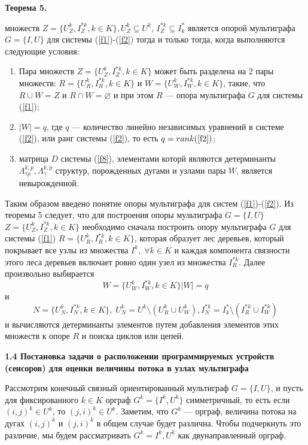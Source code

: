 \documentclass[14pt]{extarticle}%
\begin{document}
\textbf{Теорема 5.} { множеств $Z=\{U^k_Z, I^{*k}_Z, k\in K\}, U^k_Z\subseteq U^k,\, I^{*k}_Z\subseteq I^*_k$ является опорой мультиграфа $G=\{I,U\}$ для системы (\ref{f1})-(\ref{f2}) тогда и только тогда, когда выполняются следующие условия:

\begin{enumerate}
    \item Пара множеств $Z=\{U^k_Z, I^{*k}_Z, k\in K\}$ может быть разделена на 2 пары множеств: $R=\{U^k_R, I^{*k}_R, k\in K\}$ и $W=\{U^k_W, I^{*k}_W, k\in K\}$, такие, что $R\cup W=Z$ и $R\cap W=\varnothing$ и при этом $R$ --- опора мультиграфа $G$ для системы (\ref{f1});
    \item $|W|=q$, где $q$ --- количество линейно независимых уравнений в системе (\ref{f2}), или ранг системы (\ref{f2}), то есть $q=rank(\ref{f2})$;
    \item матрица $D$ системы (\ref{f8}), элементами которй являются детерминанты $\Lambda^{k,p}_{\tau\rho}, \Lambda^{k,p}_\gamma$ структур, порожденных дугами и узлами пары $W$, является невырожденной.
\end{enumerate}
}
Таким образом введено понятие опоры мультиграфа для систем (\ref{f1})-(\ref{f2}). Из теоремы 5 следует, что для построения опоры мультиграфа $G=\{I,U\}$ \\$Z=\{U^k_Z, I^{*k}_Z, k\in K\}$ необходимо сначала построить опору мультиграфа $G$ для системы (\ref{f1}) $R=\{U^k_R, I^{*k}_R, k\in K\}$, которая образует лес деревьев, который покрывает все узлы из множества $I^k,\;\forall k\in K$ и каждая компонента связности этого леса деревьев включает ровно один узел из множества $I^{*k}_R$. Далее произвольно выбирается \
$$W=\{U^k_W, I^{*k}_W, k\in K\} |W|=q$$
и 
$$N=\{U^k_N, I^{*k}_N, k\in K\},\; U^k_N=U^k\setminus (U^k_R\cup U^k_W), I^{*k}_N=I^*_k\setminus(I^{*k}_R\cup I^{*k}_W)$$
и вычисляются детерминанты элементов путем добавления элементов этих множеств к опоре $R$ и поиска циклов или цепей.

\textbf{1.4 Постановка задачи о расположении программируемых устройств (сенсоров) для оценки величины потока в узлах мультиграфа}

Рассмотрим конечный связный ориентированный мультиграф $G=\{I,U\}$, и пусть для фиксированного $k\in K$ орграф $G^k=\{I^k, U^k\}$ симметричный, то есть если $(i,j)^k\in U^k$, то $(j,i)^k\in U^k$. Заметим, что $G^k$ --- орграф, величина потока на дугах $(i,j)^k$ и $(j,i)^k$ в общем случае будет различна. Чтобы подчеркнуть это различие, мы будем рассматривать $G^k={I^k, U^k}$ как двунаправленный орграф.
\end{document}
